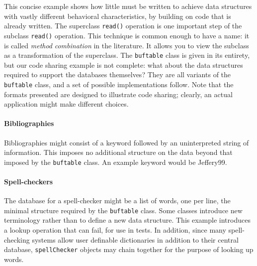 
This concise example shows how little must be written to achieve data
structures with vastly different behavioral characteristics, by
building on code that is already written. The superclass
\texttt{read()} operation is one important step of the subclass
\texttt{read()} operation. This technique is common enough to have a
name: it is called \textit{method
}\textit{combination} in the literature. It
allows you to view the subclass as a transformation of the superclass.
The \texttt{buftable} class is given in its entirety, but our code
sharing example is not complete: what about the data structures
required to support the databases themselves? They are all variants of
the \texttt{buftable} class, and a set of possible implementations
follow. Note that the formats presented are designed to illustrate code
sharing; clearly, an actual application might make different choices. 

\paragraph{Bibliographies}
Bibliographies might consist of a keyword followed by an uninterpreted
string of information. This imposes no additional structure on the data
beyond that imposed by the \texttt{buftable} class. An example keyword
would be Jeffery99. 


\paragraph{Spell-checkers}
The database for a spell-checker might be a list of words, one per
line, the minimal structure required by the \texttt{buftable} class.
Some classes introduce new terminology rather
than to define a new data structure. This example introduces a lookup
operation that can fail, for use in tests. In addition, since many
spell-checking systems allow user definable dictionaries in addition to
their central database, \texttt{spellChecker} objects may chain
together for the purpose of looking up words. 

